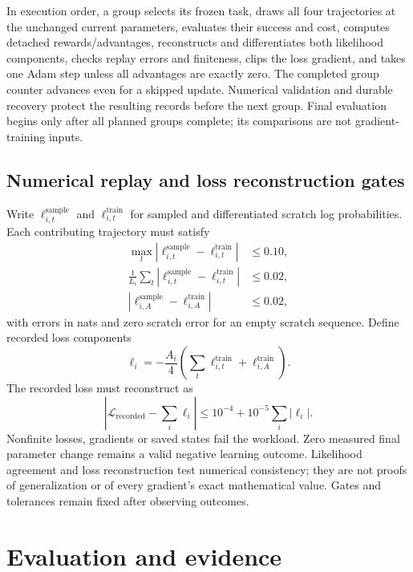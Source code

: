 \documentclass[11pt]{article}
\begin{document}
In execution order, a group selects its frozen task, draws all four trajectories at the unchanged current parameters, evaluates their success and cost, computes detached rewards/advantages, reconstructs and differentiates both likelihood components, checks replay errors and finiteness, clips the loss gradient, and takes one Adam step unless all advantages are exactly zero. The completed group counter advances even for a skipped update. Numerical validation and durable recovery protect the resulting records before the next group. Final evaluation begins only after all planned groups complete; its comparisons are not gradient-training inputs.

\subsection{Numerical replay and loss reconstruction gates}

Write $\ell^{\mathrm{sample}}_{i,t}$ and $\ell^{\mathrm{train}}_{i,t}$ for sampled and differentiated scratch log probabilities. Each contributing trajectory must satisfy
\begin{align}
 \max_t|\ell^{\mathrm{sample}}_{i,t}-\ell^{\mathrm{train}}_{i,t}|&\leq0.10,\\
 \frac1{L_i}\sum_t|\ell^{\mathrm{sample}}_{i,t}-\ell^{\mathrm{train}}_{i,t}|&\leq0.02,\\
 |\ell^{\mathrm{sample}}_{i,A}-\ell^{\mathrm{train}}_{i,A}|&\leq0.02,
 \label{eq:replaygates}
\end{align}
with errors in nats and zero scratch error for an empty scratch sequence. Define recorded loss components
\begin{equation}
 \ell_i=-\frac{A_i}{4}\left(\sum_t\ell^{\mathrm{train}}_{i,t}
                                      +\ell^{\mathrm{train}}_{i,A}\right).
\end{equation}
The recorded loss must reconstruct as
\begin{equation}
 \left|\mathcal L_{\mathrm{recorded}}-\sum_i\ell_i\right|
 \leq10^{-4}+10^{-5}\sum_i|\ell_i|.
 \label{eq:lossgate}
\end{equation}
Nonfinite losses, gradients or saved states fail the workload. Zero measured final parameter change remains a valid negative learning outcome. Likelihood agreement and loss reconstruction test numerical consistency; they are not proofs of generalization or of every gradient's exact mathematical value. Gates and tolerances remain fixed after observing outcomes.

\section{Evaluation and evidence}
\label{sec:evaluation}
\end{document}
